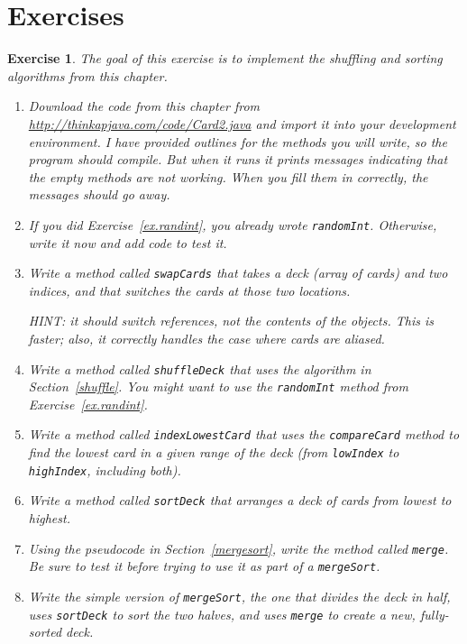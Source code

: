 \documentclass[12pt]{book}
\theoremstyle{exercise}
\newtheorem{exercise}{Exercise}[chapter]
\begin{document}
\section{Exercises}

\begin{exercise}
The goal of this exercise is to implement the shuffling and
sorting algorithms from this chapter.

\begin{enumerate}

\item Download the code from this chapter from
\url{http://thinkapjava.com/code/Card2.java}
and import it into your development environment.  I have
provided outlines for the methods you will write, so the
program should compile.  But when it runs it prints messages
indicating that the empty methods are not working.  When you
fill them in correctly, the messages should go away.

\item If you did Exercise~\ref{ex.randint}, you already wrote
{\tt randomInt}.  Otherwise, write it now and add code to test it.

\item Write a method called {\tt swapCards} that takes a
deck (array of cards) and two indices, and that switches
the cards at those two locations.

HINT: it should switch references, not
the contents of the objects.  This is faster; also, it
correctly handles the case where cards are aliased.

\item Write a method called {\tt shuffleDeck} that uses the algorithm
in Section~\ref{shuffle}.  You might want to use the {\tt randomInt}
method from Exercise~\ref{ex.randint}.

\item Write a method called {\tt indexLowestCard} that uses
the {\tt compareCard} method to find the lowest card
in a given range of the deck (from {\tt lowIndex} to {\tt highIndex},
including both).

\item Write a method called {\tt sortDeck} that arranges
a deck of cards from lowest to highest.

\item Using the pseudocode in Section~\ref{mergesort}, write the
method called {\tt merge}.  Be sure to test it before trying to use it
as part of a {\tt mergeSort}.

\item Write the simple version of {\tt mergeSort}, the one that
divides the deck in half, uses {\tt sortDeck} to sort the two
halves, and uses {\tt merge} to create a new, fully-sorted deck.


\end{enumerate}
\end{exercise}
\end{document}

